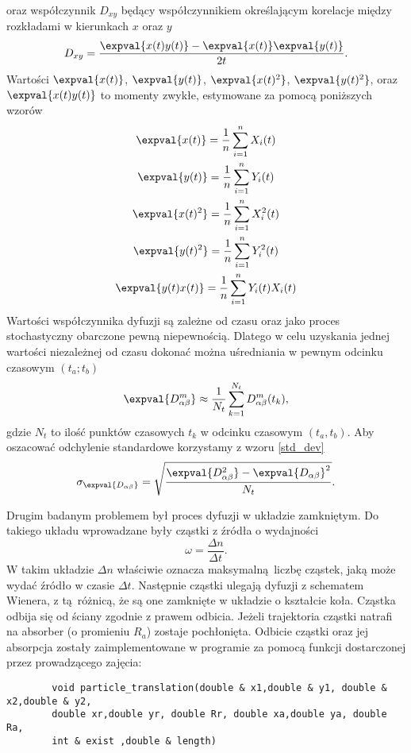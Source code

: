 \documentclass[a4paper, 12pt]{article}
\begin{document}
	oraz współczynnik $D_{xy}$ będący współczynnikiem określającym korelacje między rozkładami w kierunkach $x$ oraz $y$
	\begin{equation}
		D_{xy} = \frac{\expval{x(t)y(t)} - \expval{x(t)}\expval{y(t)}}{2t}.
	\end{equation}
	Wartości $\expval{x(t)}$, $\expval{y(t)}$, $\expval{x(t)^2}$, $\expval{y(t)^2}$, oraz $\expval{x(t)y(t)}$ to momenty zwykłe, estymowane za pomocą poniższych wzorów
	\begin{gather}
		\expval{x(t)} = \frac{1}{n} \sum_{i=1}^{n} X_i(t) \\ 
		\expval{y(t)} = \frac{1}{n} \sum_{i=1}^{n} Y_i(t) \\
		\expval{x(t)^2} = \frac{1}{n} \sum_{i=1}^{n} X_i^2(t) \\ 
		\expval{y(t)^2} = \frac{1}{n} \sum_{i=1}^{n} Y_i^2(t) \\
		\expval{y(t)x(t)} = \frac{1}{n} \sum_{i=1}^{n} Y_i(t)X_i(t) 
	\end{gather} 
	Wartości współczynnika dyfuzji są zależne od czasu oraz jako proces stochastyczny obarczone pewną niepewnością. Dlatego w celu uzyskania jednej wartości niezależnej od czasu dokonać można uśredniania w pewnym odcinku czasowym $(t_a;t_b)$
	\begin{equation}
		\expval{D_{\alpha \beta}^m} \approx \frac{1}{N_t} \sum_{k=1}^{N_t} D_{\alpha \beta}^m(t_k),
		\label{diff_coefs_mean} 
	\end{equation}
	gdzie $N_t$ to ilość punktów czasowych $t_k$ w odcinku czasowym $(t_a,t_b)$. Aby oszacować odchylenie standardowe korzystamy z wzoru \eqref{std_dev}
	\begin{equation}
		\sigma_{\expval{D_{\alpha \beta}}} = \sqrt{\frac{\expval{D_{\alpha \beta}^2} - \expval{D_{\alpha \beta}}^2}{N_t}}. 
		\label{std_dev}
	\end{equation}
	
	\noaka \krecha
	
	\noaka Drugim badanym problemem był proces dyfuzji w układzie zamkniętym. 
	Do takiego układu wprowadzane były cząstki z źródła o wydajności
	\begin{equation}
		\omega = \frac{\Delta n}{\Delta t}.
	\end{equation}
	W takim układzie $\Delta n$ właściwie oznacza maksymalną liczbę cząstek, jaką może wydać źródło w czasie $\Delta t$.
	Następnie cząstki ulegają dyfuzji z schematem Wienera, z tą różnicą, że są one zamknięte w układzie o kształcie koła.
	Cząstka odbija się od ściany zgodnie z prawem 
	odbicia.
	Jeżeli trajektoria cząstki natrafi na absorber (o promieniu $R_a$) zostaje pochłonięta. 
	Odbicie cząstki oraz jej absorpcja zostały zaimplementowane w programie za pomocą funkcji dostarczonej przez prowadzącego zajęcia:
	\begin{verbatim}
		void particle_translation(double & x1,double & y1, double & x2,double & y2, 
		double xr,double yr, double Rr, double xa,double ya, double Ra, 
		int & exist ,double & length)
	\end{verbatim}
	
\end{document}
